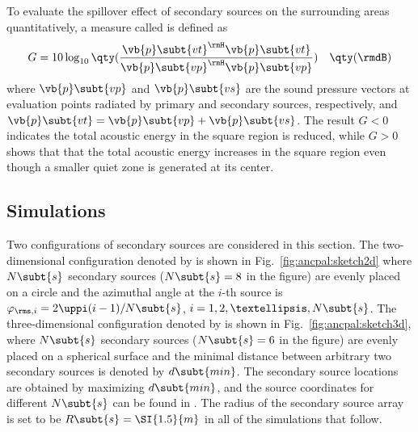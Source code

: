 To evaluate the spillover effect of secondary sources on the surrounding areas quantitatively, a measure called  is defined as
\begin{equation}
    G = 
    10\log_{10}
    \qty(\frac{\vb{p}\subt{vt}^\rmH \vb{p}\subt{vt}}{\vb{p}\subt{vp}^\rmH \vb{p}\subt{vp}})
    \quad
    \qty(\rmdB)
\end{equation}
where $\vb{p}\subt{vp}$ and $\vb{p}\subt{vs}$ are the sound pressure vectors at evaluation points radiated by primary and secondary sources, respectively, and $\vb{p}\subt{vt} = \vb{p}\subt{vp} + \vb{p}\subt{vs}$. 
The result $G < 0$ indicates the total acoustic energy in the square region is reduced, while $G > 0$ shows that that the total acoustic energy increases in the square region even though a smaller quiet zone is generated at its center.

\subsection{Simulations}
Two configurations of secondary sources are considered in this section. 
The two-dimensional configuration denoted by  is shown in Fig.~\ref{fig:ancpal:sketch2d} where $N\subt{s}$ secondary sources ($N\subt{s} = 8$ in the figure) are evenly placed on a circle and the azimuthal angle at the $i$\mbox{-th} source is $\varphi_{\rms, i} = 2\uppi(i-1)/N\subt{s}$, $i = 1, 2, …, N\subt{s}$. 
The three-dimensional configuration denoted by  is shown in Fig.~\ref{fig:ancpal:sketch3d}, where $N\subt{s}$ secondary sources ($N\subt{s} = 6$ in the figure) are evenly placed on a spherical surface and the minimal distance between arbitrary two secondary sources is denoted by $d\subt{min}$. 
The secondary source locations are obtained by maximizing $d\subt{min}$, and the source coordinates for different $N\subt{s}$ can be found in \cite{SloaneSphericalCodesNice}. 
The radius of the secondary source array is set to be $R\subt{s} = \SI{1.5}{m}$ in all of the simulations that follow.

